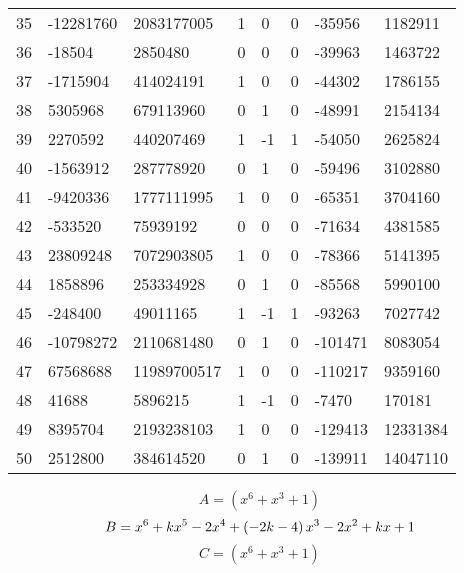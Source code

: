 \documentclass{amsart}
\begin{document}
\begin{longtable}{|l|l|l|lllll|}
35&-12281760&2083177005&1&0&0&-35956&1182911\\
36&-18504&2850480&0&0&0&-39963&1463722\\
37&-1715904&414024191&1&0&0&-44302&1786155\\
38&5305968&679113960&0&1&0&-48991&2154134\\
39&2270592&440207469&1&-1&1&-54050&2625824\\
40&-1563912&287778920&0&1&0&-59496&3102880\\
41&-9420336&1777111995&1&0&0&-65351&3704160\\
42&-533520&75939192&0&0&0&-71634&4381585\\
43&23809248&7072903805&1&0&0&-78366&5141395\\
44&1858896&253334928&0&1&0&-85568&5990100\\
45&-248400&49011165&1&-1&1&-93263&7027742\\
46&-10798272&2110681480&0&1&0&-101471&8083054\\
47&67568688&11989700517&1&0&0&-110217&9359160\\
48&41688&5896215&1&-1&0&-7470&170181\\
49&8395704&2193238103&1&0&0&-129413&12331384\\
50&2512800&384614520&0&1&0&-139911&14047110\\
\hline
\end{longtable}
$$A=(x^6
 + x^3
 + 1)$$
$$B=x^6
 + k\*x^5
 - 2\*x^4
 + \left(-2\*k
 - 4\right) \*x^3
 - 2\*x^2
 + k\*x
 + 1$$
$$C=(x^6
 + x^3
 + 1)$$
\end{document}
